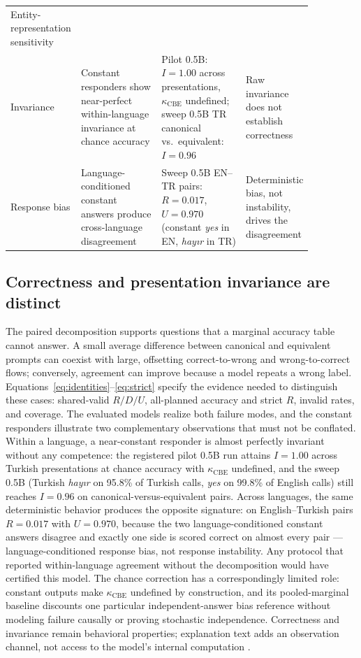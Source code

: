 \begin{table}[t]
\begin{tabular}{@{}p{0.105\linewidth}p{0.29\linewidth}p{0.295\linewidth}p{0.175\linewidth}@{}}
      Entity-representation sensitivity \\
    Invariance & Constant responders show near-perfect within-language invariance at chance accuracy &
      Pilot 0.5B: $I = 1.00$ across presentations, $\kappa_{\mathrm{CBE}}$ undefined; sweep 0.5B TR
      canonical vs.\ equivalent: $I = 0.96$ & Raw invariance does not establish correctness \\
    Response bias & Language-conditioned constant answers produce cross-language disagreement &
      Sweep 0.5B EN--TR pairs: $R = 0.017$, $U = 0.970$ (constant \emph{yes} in EN, \emph{hay\i{}r} in TR)
      & Deterministic bias, not instability, drives the disagreement \\
    \bottomrule
  \end{tabular}
\end{table}

\subsection{Correctness and presentation invariance are distinct}

The paired decomposition supports questions that a marginal accuracy table cannot answer. A small average
difference between canonical and equivalent prompts can coexist with large, offsetting correct-to-wrong and
wrong-to-correct flows; conversely, agreement can improve because a model repeats a wrong label.
Equations~\eqref{eq:identities}--\eqref{eq:strict} specify the evidence needed to distinguish these cases:
shared-valid $R/D/U$, all-planned accuracy and strict $R$, invalid rates, and coverage. The evaluated models
realize both failure modes, and the constant responders illustrate two complementary observations that
must not be conflated. Within a language, a near-constant responder is almost perfectly invariant without
any competence: the registered pilot 0.5B run attains $I = 1.00$ across Turkish presentations at chance
accuracy with $\kappa_{\mathrm{CBE}}$ undefined, and the sweep 0.5B (Turkish \emph{hay\i{}r} on 95.8\% of
Turkish calls, \emph{yes} on 99.8\% of English calls) still reaches $I = 0.96$ on canonical-versus-equivalent
pairs. Across languages, the same deterministic behavior produces the opposite signature: on
English--Turkish pairs $R = 0.017$ with $U = 0.970$, because the two language-conditioned constant answers
disagree and exactly one side is scored correct on almost every pair --- language-conditioned response
bias, not response instability. Any protocol that reported within-language agreement without the
decomposition would have certified this model. The chance correction
has a correspondingly limited role: constant outputs make $\kappa_{\mathrm{CBE}}$ undefined by construction,
and its pooled-marginal baseline discounts one particular independent-answer bias reference without
modeling failure causally or proving stochastic independence. Correctness and invariance remain behavioral
properties; explanation text adds an observation channel, not access to the model's internal computation
\citep{turpin2023unfaithful}.


